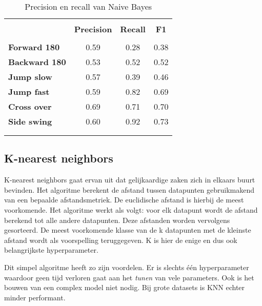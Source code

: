 \begin{table}[!htpd]
  \centering
  \caption{Precision en recall van Naive Bayes}
  \label{tab:naivebayes}
\begin{tabular}{lccc}
 \hline \\
\textbf{}             & \textbf{Precision} & \textbf{Recall} & \textbf{F1} &  \\
\hline \\
\textbf{Forward 180}  & 0.59               & 0.28            & 0.38        &  \\
\textbf{Backward 180} & 0.53               & 0.52            & 0.52        &  \\
\textbf{Jump slow}    & 0.57               & 0.39            & 0.46        &  \\
\textbf{Jump fast}    & 0.59               & 0.82            & 0.69        &  \\
\textbf{Cross over}   & 0.69               & 0.71            & 0.70        &  \\
\textbf{Side swing}   & 0.60               & 0.92            & 0.73        & \\\\
\hline \\
\end{tabular}
\end{table}

\subsection{K-nearest neighbors}
K-nearest neighbors gaat ervan uit dat gelijkaardige zaken zich in elkaars buurt bevinden. Het algoritme berekent de afstand tussen datapunten gebruikmakend van een bepaalde afstandsmetriek. De euclidische afstand is hierbij de meest voorkomende. 
Het algoritme werkt als volgt: voor elk datapunt wordt de afstand berekend tot alle andere datapunten. Deze afstanden worden vervolgens gesorteerd. 
De meest voorkomende klasse van de k datapunten met de kleinste afstand wordt als voorspelling teruggegeven. 
K is hier de enige en dus ook belangrijkste hyperparameter. 

Dit simpel algoritme heeft zo zijn voordelen. 
Er is slechts één hyperparameter waardoor geen tijd verloren gaat aan het \textit{tunen} van vele parameters. Ook is het bouwen van een complex model niet nodig. 
Bij grote datasets is KNN echter minder performant.


